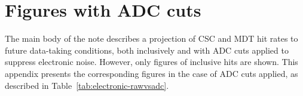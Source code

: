 \section{Figures with ADC cuts}
\label{sec:electronicnoise}

The main body of the note describes a projection of CSC and MDT hit rates to future data-taking conditions, both inclusively and with ADC cuts applied to suppress electronic noise. However, only figures of inclusive hits are shown. This appendix presents the corresponding figures in the case of ADC cuts applied, as described in Table~\ref{tab:electronic-rawvsadc}.



